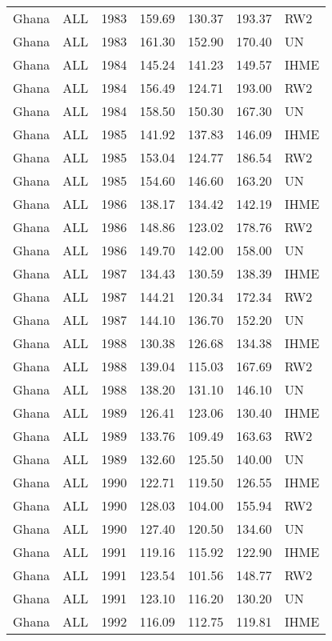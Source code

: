 \begin{longtable}{lllrrrl}
  Ghana & ALL & 1983 & 159.69 & 130.37 & 193.37 & RW2 \\ 
  Ghana & ALL & 1983 & 161.30 & 152.90 & 170.40 & UN \\ 
  Ghana & ALL & 1984 & 145.24 & 141.23 & 149.57 & IHME \\ 
  Ghana & ALL & 1984 & 156.49 & 124.71 & 193.00 & RW2 \\ 
  Ghana & ALL & 1984 & 158.50 & 150.30 & 167.30 & UN \\ 
  Ghana & ALL & 1985 & 141.92 & 137.83 & 146.09 & IHME \\ 
  Ghana & ALL & 1985 & 153.04 & 124.77 & 186.54 & RW2 \\ 
  Ghana & ALL & 1985 & 154.60 & 146.60 & 163.20 & UN \\ 
  Ghana & ALL & 1986 & 138.17 & 134.42 & 142.19 & IHME \\ 
  Ghana & ALL & 1986 & 148.86 & 123.02 & 178.76 & RW2 \\ 
  Ghana & ALL & 1986 & 149.70 & 142.00 & 158.00 & UN \\ 
  Ghana & ALL & 1987 & 134.43 & 130.59 & 138.39 & IHME \\ 
  Ghana & ALL & 1987 & 144.21 & 120.34 & 172.34 & RW2 \\ 
  Ghana & ALL & 1987 & 144.10 & 136.70 & 152.20 & UN \\ 
  Ghana & ALL & 1988 & 130.38 & 126.68 & 134.38 & IHME \\ 
  Ghana & ALL & 1988 & 139.04 & 115.03 & 167.69 & RW2 \\ 
  Ghana & ALL & 1988 & 138.20 & 131.10 & 146.10 & UN \\ 
  Ghana & ALL & 1989 & 126.41 & 123.06 & 130.40 & IHME \\ 
  Ghana & ALL & 1989 & 133.76 & 109.49 & 163.63 & RW2 \\ 
  Ghana & ALL & 1989 & 132.60 & 125.50 & 140.00 & UN \\ 
  Ghana & ALL & 1990 & 122.71 & 119.50 & 126.55 & IHME \\ 
  Ghana & ALL & 1990 & 128.03 & 104.00 & 155.94 & RW2 \\ 
  Ghana & ALL & 1990 & 127.40 & 120.50 & 134.60 & UN \\ 
  Ghana & ALL & 1991 & 119.16 & 115.92 & 122.90 & IHME \\ 
  Ghana & ALL & 1991 & 123.54 & 101.56 & 148.77 & RW2 \\ 
  Ghana & ALL & 1991 & 123.10 & 116.20 & 130.20 & UN \\ 
  Ghana & ALL & 1992 & 116.09 & 112.75 & 119.81 & IHME \\ 

\end{longtable}
